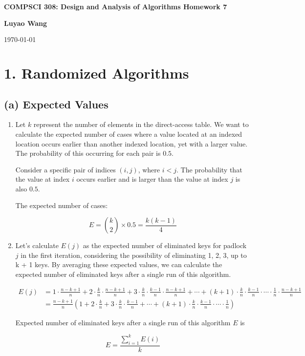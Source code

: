 \documentclass[10pt]{article}
\begin{document}

\begin{center}
  {\Large \bf COMPSCI 308: Design and Analysis of Algorithms Homework 7}
  \vspace{2mm}

  {\bf Luyao Wang}

  {\today}
\end{center}

\section*{1. Randomized Algorithms}

\subsection*{(a) Expected Values}

\begin{enumerate}
  \item {
        Let $k$ represent the number of elements in the direct-access table. We want to calculate the expected number of cases where a value located at an indexed location occurs earlier than another indexed location, yet with a larger value. The probability of this occurring for each pair is $0.5$.

        Consider a specific pair of indices $(i, j)$, where $i < j$. The probability that the value at index $i$ occurs earlier and is larger than the value at index $j$ is also $0.5$.

        The expected number of cases:

        \[
          E = \binom{k}{2} \times 0.5 = \frac{k(k - 1)}{4}
        \]
        }
  \item {
        Let's calculate $E(j)$ as the expected number of eliminated keys for padlock $j$ in the first iteration, considering the possibility of eliminating 1, 2, 3, up to k + 1 keys. By averaging these expected values, we can calculate the expected number of eliminated keys after a single run of this algorithm.

        \begin{align*}E(j)
           & = 1 \cdot \frac{n-k+1}{n} + 2 \cdot \frac{k}{n} \cdot \frac{n-k+1}{n} + 3 \cdot \frac{k}{n} \cdot \frac{k-1}{n} \cdot \frac{n-k+1}{n} + \cdots + (k+1) \cdot \frac{k}{n} \cdot \frac{k-1}{n} \cdot \cdots \cdot \frac{1}{n} \cdot \frac{n-k+1}{n} \\
           & =  \frac{n-k+1}{n} (1 + 2 \cdot \frac{k}{n} + 3 \cdot \frac{k}{n} \cdot \frac{k-1}{n} + \cdots +  (k+1) \cdot \frac{k}{n} \cdot \frac{k-1}{n} \cdot \cdots \cdot \frac{1}{n})
        \end{align*}

        Expected number of eliminated keys after a single run of this algorithm $E$ is

        \[E = \frac{\sum_{i = 1}^{k} E(i)}{k}\]
        }
\end{enumerate}
\end{document}
